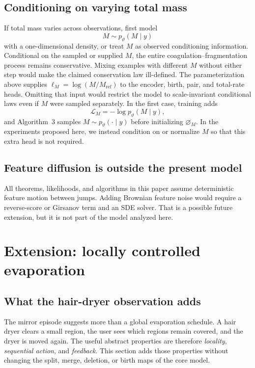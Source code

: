 \documentclass[10pt]{article}
\theoremstyle{definition}
\theoremstyle{remark}
\newcommand{\emptyconfig}{\varnothing_M}
\begin{document}
\subsection{Conditioning on varying total mass}

If total mass varies across observations, first model
\begin{equation}
  M\sim p_\vartheta(M\mid y)
\end{equation}
with a one-dimensional density, or treat $M$ as observed conditioning information.  Conditional on the sampled or supplied $M$, the entire coagulation--fragmentation process remains conservative.  Mixing examples with different $M$ without either step would make the claimed conservation law ill-defined.
The parameterization above supplies $\ell_M=\log(M/M_{\mathrm{ref}})$ to the encoder, birth, pair,
and total-rate heads.  Omitting that input would restrict the model to
scale-invariant conditional laws even if $M$ were sampled separately.
In the first case, training adds
\begin{equation}
  \mathcal L_M=-\log p_\vartheta(M\mid y),
\end{equation}
and Algorithm~3 samples $M\sim p_\vartheta(\cdot\mid y)$ before initializing
$\emptyconfig$.  In the experiments proposed here, we instead condition on
or normalize $M$ so that this extra head is not required.

\subsection{Feature diffusion is outside the present model}

All theorems, likelihoods, and algorithms in this paper assume deterministic
feature motion between jumps.  Adding Brownian feature noise would require a
reverse-score or Girsanov term and an SDE solver.  That is a possible future
extension, but it is not part of the model analyzed here.

\section{Extension: locally controlled evaporation}
\label{sec:local-control}

\subsection{What the hair-dryer observation adds}

The mirror episode suggests more than a global evaporation schedule.  A
hair dryer clears a small region, the user sees which regions remain covered,
and the dryer is moved again.  The useful abstract properties are therefore
\emph{locality}, \emph{sequential action}, and \emph{feedback}.  This section
adds those properties without changing the split, merge, deletion, or birth
maps of the core model.
\end{document}
